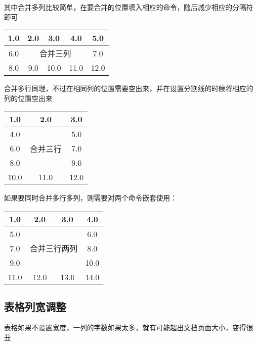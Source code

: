     其中合并多列比较简单，在要合并的位置填入相应的命令，随后减少相应的分隔符即可
    \begin{texshow}
        \begin{tabular}{|c|c|c|c|c|}
            \hline
            1.0&2.0&3.0&4.0&5.0\\
            \hline
            6.0&\multicolumn{3}{c|}{合并三列}&7.0\\
            \hline
            8.0&9.0&10.0&11.0&12.0\\
            \hline
        \end{tabular}
    \end{texshow}

    合并多行同理，不过在相同列的位置需要空出来，并在设置分割线的时候将相应的列的位置空出来
    \begin{texshow}
        \begin{tabular}{|c|c|c|}
            \hline
            1.0&2.0&3.0\\
            \hline
            4.0&\multirow{3}{*}{合并三行}&5.0\\
            \cline{1-1}
            \cline{3-3}
            6.0&&7.0\\
            \cline{1-1}
            \cline{3-3}
            8.0&&9.0\\
            \hline
            10.0&11.0&12.0\\
            \hline
        \end{tabular}
    \end{texshow}

    如果要同时合并多行多列，则需要对两个命令嵌套使用：
    \begin{texshow}
        \begin{tabular}{|c|c|c|c|}
            \hline
            1.0&2.0&3.0&4.0\\
            \hline
            5.0&\multicolumn{2}{c|}{\multirow{3}{*}{合并三行两列}}&6.0\\
            \cline{1-1}
            \cline{4-4}
            7.0&\multicolumn{2}{c|}{}&8.0\\
            \cline{1-1}
            \cline{4-4}
            9.0&\multicolumn{2}{c|}{}&10.0\\
            \hline
            11.0&12.0&13.0&14.0\\
            \hline
        \end{tabular}
    \end{texshow}
    

    \subsection{表格列宽调整}
    表格如果不设置宽度，一列的字数如果太多，就有可能超出文档页面大小，变得很丑

